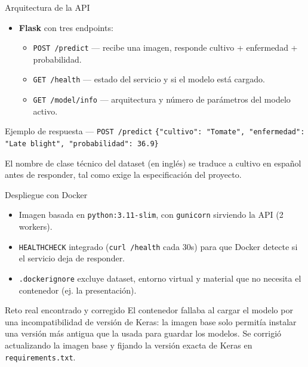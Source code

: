 \documentclass[aspectratio=169]{beamer}
\begin{document}
\begin{frame}{Arquitectura de la API}
  \begin{itemize}
    \item \textbf{Flask} con tres endpoints:
    \begin{itemize}
      \item \texttt{POST /predict} — recibe una imagen, responde cultivo + enfermedad + probabilidad.
      \item \texttt{GET /health} — estado del servicio y si el modelo está cargado.
      \item \texttt{GET /model/info} — arquitectura y número de parámetros del modelo activo.
    \end{itemize}
  \end{itemize}
  \begin{block}{Ejemplo de respuesta — \texttt{POST /predict}}
    \texttt{\{"cultivo": "Tomate", "enfermedad": "Late blight", "probabilidad": 36.9\}}
  \end{block}
  \footnotesize El nombre de clase técnico del dataset (en inglés) se traduce a cultivo en español antes de responder, tal como exige la especificación del proyecto.
\end{frame}

\begin{frame}{Despliegue con Docker}
  \begin{itemize}
    \item Imagen basada en \texttt{python:3.11-slim}, con \texttt{gunicorn} sirviendo la API (2 workers).
    \item \texttt{HEALTHCHECK} integrado (\texttt{curl /health} cada 30s) para que Docker detecte si el servicio deja de responder.
    \item \texttt{.dockerignore} excluye dataset, entorno virtual y material que no necesita el contenedor (ej. la presentación).
  \end{itemize}
  \begin{alertblock}{Reto real encontrado y corregido}
    El contenedor fallaba al cargar el modelo por una incompatibilidad de versión de Keras: la imagen base solo permitía instalar una versión más antigua que la usada para guardar los modelos. Se corrigió actualizando la imagen base y fijando la versión exacta de Keras en \texttt{requirements.txt}.
  \end{alertblock}
\end{frame}
\end{document}
